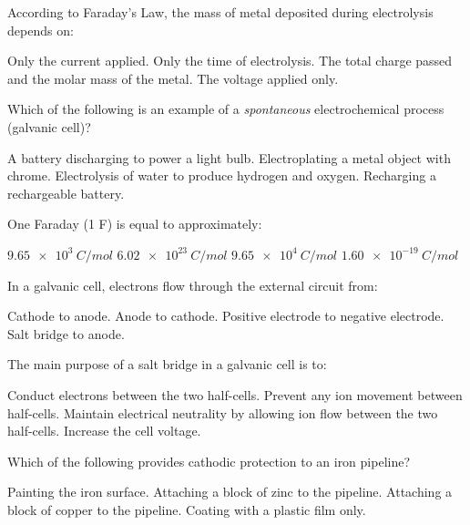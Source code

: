 \documentclass[addpoints]{exam}
\begin{document}
\begin{questions}
\question[1] According to Faraday's Law, the mass of metal deposited during electrolysis
depends on:
\begin{choices}
    \choice Only the current applied.
    \choice Only the time of electrolysis.
    \correctchoice The total charge passed and the molar mass of the metal.
    \choice The voltage applied only.
\end{choices}

\question[1] Which of the following is an example of a \textit{spontaneous} electrochemical
process (galvanic cell)?
\begin{choices}
    \correctchoice A battery discharging to power a light bulb.
    \choice Electroplating a metal object with chrome.
    \choice Electrolysis of water to produce hydrogen and oxygen.
    \choice Recharging a rechargeable battery.
\end{choices}

\question[1] One Faraday (1 F) is equal to approximately:
\begin{choices}
    \choice $\SI{9.65e3}{C/mol}$
    \choice $\SI{6.02e23}{C/mol}$
    \correctchoice $\SI{9.65e4}{C/mol}$
    \choice $\SI{1.60e-19}{C/mol}$
\end{choices}

\question[1] In a galvanic cell, electrons flow through the external circuit from:
\begin{choices}
    \choice Cathode to anode.
    \correctchoice Anode to cathode.
    \choice Positive electrode to negative electrode.
    \choice Salt bridge to anode.
\end{choices}

\question[1] The main purpose of a salt bridge in a galvanic cell is to:
\begin{choices}
    \choice Conduct electrons between the two half-cells.
    \choice Prevent any ion movement between half-cells.
    \correctchoice Maintain electrical neutrality by allowing ion flow between the two half-cells.
    \choice Increase the cell voltage.
\end{choices}

\question[1] Which of the following provides cathodic protection to an iron pipeline?
\begin{choices}
    \choice Painting the iron surface.
    \correctchoice Attaching a block of zinc to the pipeline.
    \choice Attaching a block of copper to the pipeline.
    \choice Coating with a plastic film only.
\end{choices}


\end{questions}
\end{document}
